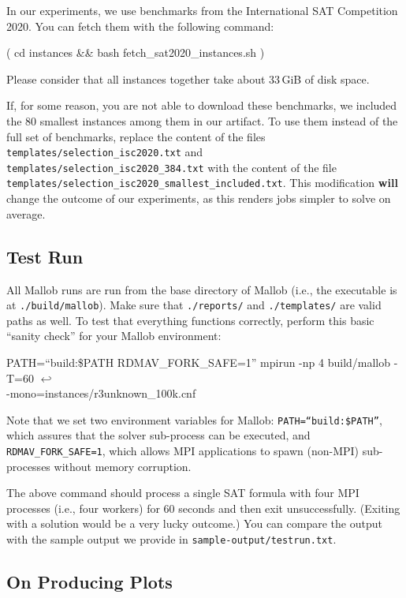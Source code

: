 \documentclass[runningheads]{article}
\newcommand{\CR}{{\tiny$\hookleftarrow$}}
\numberwithin{dummy}{subsection}
\begin{document}
In our experiments, we use benchmarks from the International SAT Competition 2020.
You can fetch them with the following command:
\begin{ttfenv}
( cd instances \&\& bash fetch\_sat2020\_instances.sh )
\end{ttfenv}
Please consider that all instances together take about 33$\,$GiB of disk space.

If, for some reason, you are not able to download these benchmarks, we included the 80 smallest instances among them in our artifact.
To use them instead of the full set of benchmarks, replace the content of the files \texttt{templates/selection\_isc2020.txt} and \texttt{templates/selection\_isc2020\_384.txt} with the content of the file \texttt{templates/selection\_isc2020\_smallest\_included.txt}.
This modification \textbf{will} change the outcome of our experiments, as this renders jobs simpler to solve on average.

\subsection{Test Run}

All Mallob runs are run from the base directory of Mallob (i.e., the executable is at \texttt{./build/mallob}).
Make sure that \texttt{./reports/} and \texttt{./templates/} are valid paths as well.
To test that everything functions correctly, perform this basic ``sanity check'' for your Mallob environment:

\begin{ttfenv}
PATH=``build:\$PATH RDMAV\_FORK\_SAFE=1'' mpirun -np 4 build/mallob -T=60 \CR\\
-mono=instances/r3unknown\_100k.cnf
\end{ttfenv}

Note that we set two environment variables for Mallob: \texttt{PATH=``build:\$PATH''}, which assures that the solver sub-process can be executed, and \texttt{RDMAV\_FORK\_SAFE=1}, which allows MPI applications to spawn (non-MPI) sub-processes without memory corruption.

The above command should process a single SAT formula with four MPI processes (i.e., four workers) for 60 seconds and then exit unsuccessfully. (Exiting with a solution would be a very lucky outcome.)
You can compare the output with the sample output we provide in \texttt{sample-output/testrun.txt}.

\subsection{On Producing Plots}
\label{sec:plots}
\end{document}
